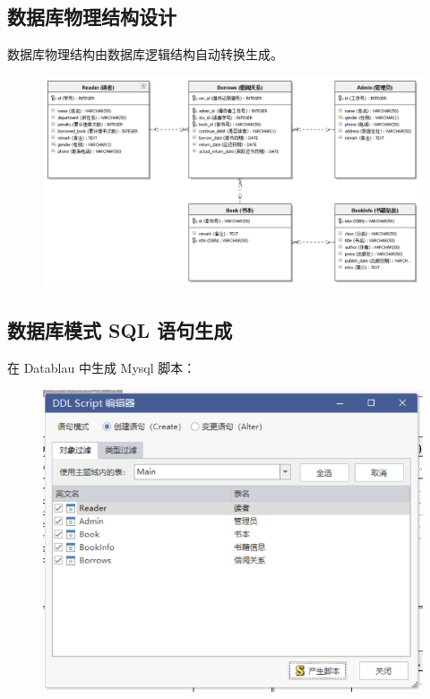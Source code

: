 \documentclass{article}
\begin{document}
\newpage


\subsection{数据库物理结构设计}

数据库物理结构由数据库逻辑结构自动转换生成。

\begin{figure}[!h]
\centering
\includegraphics[scale=0.5]{db_imgs/logic2.PNG}
\end{figure}

\subsection{数据库模式 SQL 语句生成}

在 Datablau 中生成 Mysql 脚本：

\begin{figure}[!h]
\centering
\includegraphics[scale=0.5]{db_imgs/script.PNG}
\end{figure}
\end{document}
